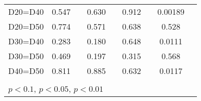 \begin{tabular}{l|cccccc|cc}
D20=D40         &    0.547         &         &    0.630         &         &    0.912         &         &  0.00189         &         \\
D20=D50         &    0.774         &         &    0.571         &         &    0.638         &         &    0.528         &         \\
D30=D40         &    0.283         &         &    0.180         &         &    0.648         &         &   0.0111         &         \\
D30=D50         &    0.469         &         &    0.197         &         &    0.315         &         &    0.568         &         \\
D40=D50         &    0.811         &         &    0.885         &         &    0.632         &         &   0.0117         &         \\
\hline\hline
\multicolumn{9}{p{16cm}}{\tiny }\\
\multicolumn{9}{l}{\tiny \sym{*} \(p<0.1\), \sym{**} \(p<0.05\), \sym{***} \(p<0.01\)}\\
\end{tabular}